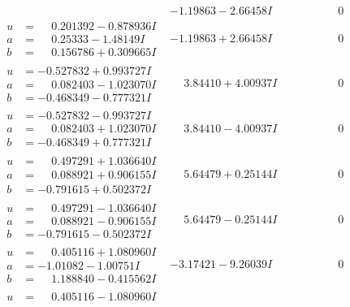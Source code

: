 \documentclass[1p]{elsarticle_modified}
\theoremstyle{definition}
\begin{document}
$$\begin{array}{c|c|c}
 & -1.19863 - 2.66458 I & \phantom{-0.000000 } 0 \\ \hline\begin{aligned}
u &= \phantom{-}0.201392 - 0.878936 I \\
a &= \phantom{-}0.25333 - 1.48149 I \\
b &= \phantom{-}0.156786 + 0.309665 I\end{aligned}
 & -1.19863 + 2.66458 I & \phantom{-0.000000 } 0 \\ \hline\begin{aligned}
u &= -0.527832 + 0.993727 I \\
a &= \phantom{-}0.082403 - 1.023070 I \\
b &= -0.468349 - 0.777321 I\end{aligned}
 & \phantom{-}3.84410 + 4.00937 I & \phantom{-0.000000 } 0 \\ \hline\begin{aligned}
u &= -0.527832 - 0.993727 I \\
a &= \phantom{-}0.082403 + 1.023070 I \\
b &= -0.468349 + 0.777321 I\end{aligned}
 & \phantom{-}3.84410 - 4.00937 I & \phantom{-0.000000 } 0 \\ \hline\begin{aligned}
u &= \phantom{-}0.497291 + 1.036640 I \\
a &= \phantom{-}0.088921 + 0.906155 I \\
b &= -0.791615 + 0.502372 I\end{aligned}
 & \phantom{-}5.64479 + 0.25144 I & \phantom{-0.000000 } 0 \\ \hline\begin{aligned}
u &= \phantom{-}0.497291 - 1.036640 I \\
a &= \phantom{-}0.088921 - 0.906155 I \\
b &= -0.791615 - 0.502372 I\end{aligned}
 & \phantom{-}5.64479 - 0.25144 I & \phantom{-0.000000 } 0 \\ \hline\begin{aligned}
u &= \phantom{-}0.405116 + 1.080960 I \\
a &= -1.01082 - 1.00751 I \\
b &= \phantom{-}1.188840 - 0.415562 I\end{aligned}
 & -3.17421 - 9.26039 I & \phantom{-0.000000 } 0 \\ \hline\begin{aligned}
u &= \phantom{-}0.405116 - 1.080960 I \\

\end{aligned}
\end{array}$$
\end{document}
